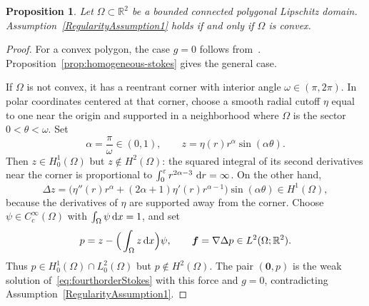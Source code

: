 \documentclass[10pt]{amsart}
\newtheorem{proposition}[theorem]{Proposition}
\newcommand{\dx}{\,{\rm d}x}
\newcommand{\dd}{\,{\rm d}}
\numberwithin{equation}{section}
\begin{document}
\begin{proposition}\label{prop:convex-stokes}
Let $\Omega\subset\mathbb R^2$ be a bounded connected polygonal Lipschitz domain. Assumption~\ref{RegularityAssumption1} holds if and only if $\Omega$ is convex.
\end{proposition}
\begin{proof}
For a convex polygon, the case $g=0$ follows from~\cite[Theorem~3.6]{ChenHuangHuang2023}. Proposition~\ref{prop:homogeneous-stokes} gives the general case.

If $\Omega$ is not convex, it has a reentrant corner with interior angle $\omega\in(\pi,2\pi)$. In polar coordinates centered at that corner, choose a smooth radial cutoff $\eta$ equal to one near the origin and supported in a neighborhood where $\Omega$ is the sector $0<\theta<\omega$. Set
\[
\alpha=\frac{\pi}{\omega}\in(0,1),\qquad
z=\eta(r)r^\alpha\sin(\alpha\theta).
\]
Then $z\in H_0^1(\Omega)$ but $z\notin H^2(\Omega)$: the squared integral of its second derivatives near the corner is proportional to $\int_0^\varepsilon r^{2\alpha-3}\,\dd r=\infty$. On the other hand,
\[
\Delta z=\big(\eta''(r)r^\alpha+(2\alpha+1)\eta'(r)r^{\alpha-1}\big)\sin(\alpha\theta)\in H^1(\Omega),
\]
because the derivatives of $\eta$ are supported away from the corner. Choose $\psi\in C_c^\infty(\Omega)$ with $\int_\Omega\psi\dx=1$, and set
\[
p=z-\Big(\int_\Omega z\dx\Big)\psi,\qquad
\boldsymbol f=\nabla\Delta p\in L^2(\Omega;\mathbb R^2).
\]
Thus $p\in H_0^1(\Omega)\cap L_0^2(\Omega)$ but $p\notin H^2(\Omega)$. The pair $(\boldsymbol0,p)$ is the weak solution of~\eqref{eq:fourthorderStokes} with this force and $g=0$, contradicting Assumption~\ref{RegularityAssumption1}.
\end{proof}
\end{document}
